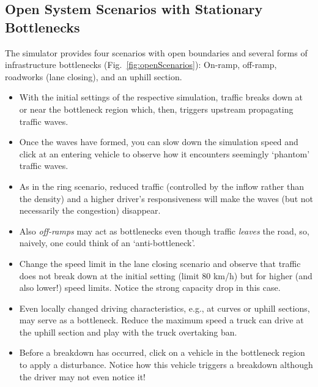 \documentclass[paper=A4,pagesize=auto,11pt]{scrartcl}
\providecommand{\gquote}[1]{`#1'}
\begin{document}
\subsection{Open System Scenarios with Stationary Bottlenecks}
The simulator provides four scenarios with open boundaries and several
forms of infrastructure bottlenecks (Fig.~\ref{fig:openScenarios}):
On-ramp, off-ramp, roadworks (lane closing), and
an uphill section.


\begin{itemize}
\item
With the initial settings of the respective simulation, traffic breaks
down at or near the bottleneck region which, then, triggers upstream
propagating traffic waves.
\item 
Once the waves have formed, you can slow down the simulation speed
and click at an entering vehicle to observe how it encounters
seemingly \gquote{phantom} traffic waves. 
\item
As in the ring scenario, reduced traffic (controlled by the inflow
rather than the density) and a higher driver's responsiveness will
make the waves (but not necessarily the congestion) disappear.
\item 
Also \emph{off-ramps} may act as bottlenecks even though traffic
\emph{leaves} the road,  so, naively, one could think of an
\gquote{anti-bottleneck}.
\item Change the speed limit in the lane closing scenario and
  observe that traffic does not break down at the initial setting
  (limit 80 km/h) but for higher (and also lower!) speed
  limits. Notice the strong capacity drop in this case.
\item
Even locally changed driving characteristics, e.g., at curves or uphill
sections, may serve as a bottleneck. Reduce the maximum speed a truck
can drive at the uphill section and play with the truck overtaking
ban.
\item Before a breakdown has occurred, click on a vehicle in the
  bottleneck region to apply a disturbance. Notice how this vehicle
  triggers a breakdown although the driver may not even notice it!
\end{itemize}
\end{document}
